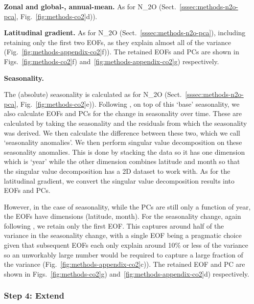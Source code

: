 \textbf{Zonal and global-, annual-mean.}
As for N_2O (Sect.~\ref{sssec:methods-n2o-pca}, Fig.~\ref{fig:methods-co2}d)).

\textbf{Latitudinal gradient.}
As for N_2O (Sect.~\ref{sssec:methods-n2o-pca}),
including retaining only the first two EOFs,
as they explain almost all of the variance (Fig.~\ref{fig:methods-appendix-co2}f)).
The retained EOFs and PCs are shown in Figs.~\ref{fig:methods-co2}f) and~\ref{fig:methods-appendix-co2}g) respectively.

\textbf{Seasonality.}

The (absolute) seasonality is calculated as for N_2O (Sect.~\ref{sssec:methods-n2o-pca}, Fig.~\ref{fig:methods-co2}e)).
Following \citet{meinshausen_historical-ghgs_2017}, on top of this `base' seasonality,
we also calculate EOFs and PCs for the change in seasonality over time.
These are calculated by taking the seasonality and the residuals from which the seasonality was derived.
We then calculate the difference between these two, which we call `seasonality anomalies'.
We then perform singular value decomposition on these seasonality anomalies.
This is done by stacking the data so it has one dimension which is `year'
while the other dimension combines latitude and month
so that the singular value decomposition has a 2D dataset to work with.
As for the latitudinal gradient, we convert the singular value decomposition results into EOFs and PCs.

However, in the case of seasonality, while the PCs are still only a function of year,
the EOFs have dimensions (latitude, month).
For the seasonality change, again following \cite{meinshausen_historical-ghgs_2017},
we retain only the first EOF.
This captures around half of the variance in the seasonality change,
with a single EOF being a pragmatic choice given that subsequent EOFs each only explain around 10\% or less of the variance
so an unworkably large number would be required to capture a large fraction of the variance
(Fig.~\ref{fig:methods-appendix-co2}c)).
The retained EOF and PC are shown in Figs.~\ref{fig:methods-co2}g) and~\ref{fig:methods-appendix-co2}d) respectively.

\subsubsection{Step 4: Extend}
\label{sssec:methods-co2-extend}

